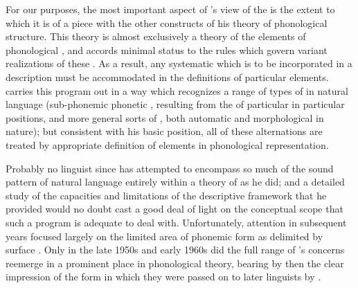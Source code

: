 For our purposes, the most important aspect of {\Trubetzkoy}'s view of
the  is the extent to which it is of a piece with the other
constructs of his theory of phonological structure. This theory is
almost exclusively a theory of the  elements of phonological
, and accords minimal status to the {rules} which govern
variant realizations of these . As a result, any
systematic  which is to be incorporated in a description must
be accommodated in the definitions of particular elements. {\Trubetzkoy}
carries this program out in a way which recognizes a range of types of
 in natural language (sub-phonemic phonetic ,
 resulting from the  of particular 
in particular positions, and more general sorts of , both
automatic and morphological in nature); but consistent with his basic
position, all of these alternations are treated by appropriate
definition of elements in phonological representation.

Probably no linguist since has attempted to encompass so much of the
sound pattern of natural language entirely within a theory of
 as he did; and a detailed study of the capacities and
limitations of the descriptive framework that he provided would no
doubt cast a good deal of light on the conceptual scope that such a
program is adequate to deal with. Unfortunately, attention in
subsequent years focused largely on the limited area of phonemic form
as delimited by surface . Only in the late 1950s and early
1960s did the full range of {\Trubetzkoy}'s concerns reemerge in a
prominent place in phonological theory, bearing by then the clear
impression of the form in which they were passed on to later linguists
by .

